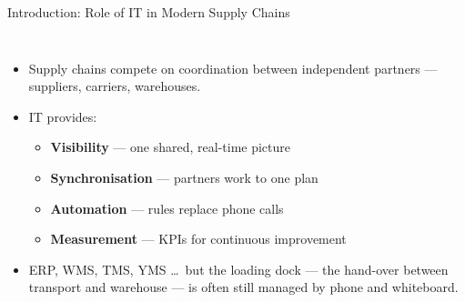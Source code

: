 \documentclass[aspectratio=169,11pt]{beamer}
\begin{document}
\begin{frame}{Introduction: Role of IT in Modern Supply Chains}
\begin{columns}[T]
\begin{itemize}
  \item Supply chains compete on \alert{coordination} between independent partners --- suppliers, carriers, warehouses.
  \item IT provides:
  \begin{itemize}
    \item \textbf{Visibility} --- one shared, real-time picture
    \item \textbf{Synchronisation} --- partners work to one plan
    \item \textbf{Automation} --- rules replace phone calls
    \item \textbf{Measurement} --- KPIs for continuous improvement
  \end{itemize}
  \item ERP, WMS, TMS, YMS \ldots\ but the \alert{loading dock} --- the hand-over between transport and warehouse --- is often still managed by phone and whiteboard.
\end{itemize}
\end{columns}
\end{frame}
\end{document}
